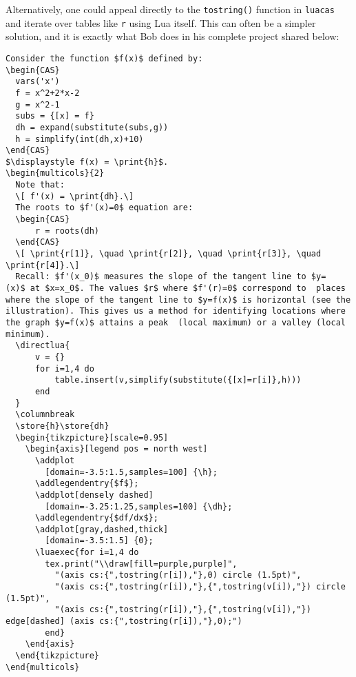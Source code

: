 \documentclass{article}
\begin{document}
Alternatively, one could appeal directly to the \texttt{tostring()} function in \texttt{luacas} and iterate over tables like \texttt{r} using Lua itself. This can often be a simpler solution, and it is exactly what Bob does in his complete project shared below:
\begin{codebox}
\begin{verbatim}
Consider the function $f(x)$ defined by:
\begin{CAS}
  vars('x')
  f = x^2+2*x-2
  g = x^2-1
  subs = {[x] = f}
  dh = expand(substitute(subs,g))
  h = simplify(int(dh,x)+10)
\end{CAS}
$\displaystyle f(x) = \print{h}$.
\begin{multicols}{2}
  Note that: 
  \[ f'(x) = \print{dh}.\] 
  The roots to $f'(x)=0$ equation are:
  \begin{CAS}
      r = roots(dh)
  \end{CAS}
  \[ \print{r[1]}, \quad \print{r[2]}, \quad \print{r[3]}, \quad  \print{r[4]}.\] 
  Recall: $f'(x_0)$ measures the slope of the tangent line to $y=  (x)$ at $x=x_0$. The values $r$ where $f'(r)=0$ correspond to  places where the slope of the tangent line to $y=f(x)$ is horizontal (see the illustration). This gives us a method for identifying locations where the graph $y=f(x)$ attains a peak  (local maximum) or a valley (local minimum). 
  \directlua{
      v = {}
      for i=1,4 do 
          table.insert(v,simplify(substitute({[x]=r[i]},h)))
      end
  }
  \columnbreak 
  \store{h}\store{dh}
  \begin{tikzpicture}[scale=0.95]
    \begin{axis}[legend pos = north west]
      \addplot 
        [domain=-3.5:1.5,samples=100] {\h};
      \addlegendentry{$f$};
      \addplot[densely dashed] 
        [domain=-3.25:1.25,samples=100] {\dh};
      \addlegendentry{$df/dx$};
      \addplot[gray,dashed,thick]
        [domain=-3.5:1.5] {0};
      \luaexec{for i=1,4 do 
        tex.print("\\draw[fill=purple,purple]",
          "(axis cs:{",tostring(r[i]),"},0) circle (1.5pt)",
          "(axis cs:{",tostring(r[i]),"},{",tostring(v[i]),"}) circle (1.5pt)",
          "(axis cs:{",tostring(r[i]),"},{",tostring(v[i]),"}) edge[dashed] (axis cs:{",tostring(r[i]),"},0);")
        end}
    \end{axis}
  \end{tikzpicture}
\end{multicols}
\end{verbatim}
\end{codebox}
\end{document}
